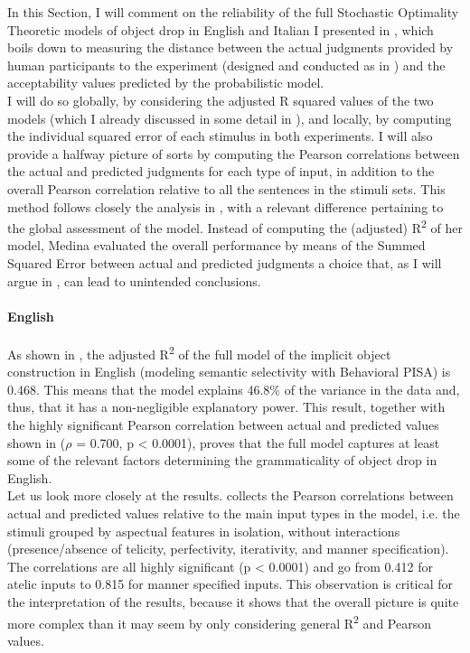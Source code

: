 In this Section, I will comment on the reliability of the full Stochastic Optimality Theoretic models of object drop in English and Italian I presented in , which boils down to measuring the distance between the actual judgments provided by human participants to the experiment (designed and conducted as in ) and the acceptability values predicted by the probabilistic model.\\
I will do so globally, by considering the adjusted R squared values of the two models (which I already discussed in some detail in ), and locally, by computing the individual squared error of each stimulus in both experiments. I will also provide a halfway picture of sorts by computing the Pearson correlations between the actual and predicted judgments for each type of input, in addition to the overall Pearson correlation relative to all the sentences in the stimuli sets. This method follows closely the analysis in \textcite[146-154]{Medina2007}, with a relevant difference pertaining to the global assessment of the model. Instead of computing the (adjusted) R\textsuperscript{2} of her model, Medina evaluated the overall performance by means of the Summed Squared Error between actual and predicted judgments \textemdash a choice that, as I will argue in , can lead to unintended conclusions.


\paragraph{English} 
As shown in , the adjusted R\textsuperscript{2} of the full model of the implicit object construction in English (modeling semantic selectivity with Behavioral PISA) is 0.468. This means that the model explains 46.8\% of the variance in the data and, thus, that it has a non-negligible explanatory power. This result, together with the highly significant Pearson correlation between actual and predicted values shown in  ($\rho$ = 0.700, p < 0.0001), proves that the full model captures at least some of the relevant factors determining the grammaticality of object drop in English.\\
Let us look more closely at the results.  collects the Pearson correlations between actual and predicted values relative to the main input types in the model, i.e. the stimuli grouped by aspectual features in isolation, without interactions (presence/absence of telicity, perfectivity, iterativity, and manner specification). The correlations are all highly significant (p < 0.0001) and go from 0.412 for atelic inputs to 0.815 for manner specified inputs. This observation is critical for the interpretation of the results, because it shows that the overall picture is quite more complex than it may seem by only considering general R\textsuperscript{2} and Pearson values.


